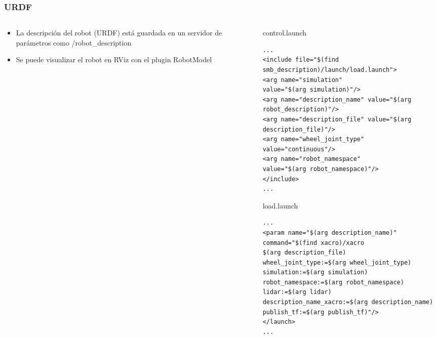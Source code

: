 \begin{frame}[fragile]
    \frametitle{URDF}
    
\footnotesize

\begin{columns}
\begin{column}{0.4\textwidth}
\begin{itemize}
\item La descripción del robot (URDF) está guardada en un servidor de parámetros como /robot\_description
\item Se puede visualizar el robot en RViz con el plugin RobotModel
\end{itemize}
\end{column}
\begin{column}{0.6\textwidth}

control.launch
\begin{lstlisting}[style=xml,basicstyle=\tiny]
...
<include file="$(find smb_description)/launch/load.launch">
<arg name="simulation"
value="$(arg simulation)"/>
<arg name="description_name" value="$(arg robot_description)"/>
<arg name="description_file" value="$(arg description_file)"/>
<arg name="wheel_joint_type" value="continuous"/>
<arg name="robot_namespace"
value="$(arg robot_namespace)"/>
</include>
...
\end{lstlisting}

load.launch
\begin{lstlisting}[style=xml,basicstyle=\tiny]
...
<param name="$(arg description_name)" command="$(find xacro)/xacro
$(arg description_file)
wheel_joint_type:=$(arg wheel_joint_type)
simulation:=$(arg simulation)
robot_namespace:=$(arg robot_namespace)
lidar:=$(arg lidar)
description_name_xacro:=$(arg description_name)
publish_tf:=$(arg publish_tf)"/>
</launch>
...
\end{lstlisting}
	
\end{column}
\end{columns}

\end{frame}

